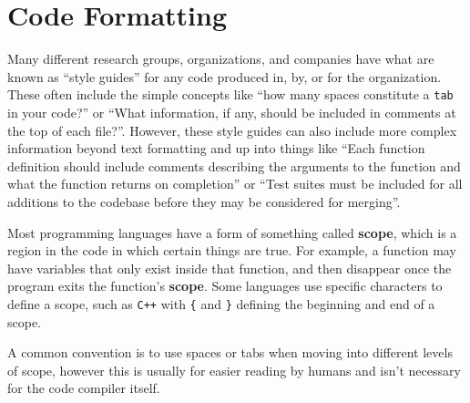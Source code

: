 \section{Code Formatting}
Many different research groups, organizations, and companies have what
are known as ``style guides'' for any code produced in, by, or for the
organization. These often include the simple concepts like ``how many
spaces constitute a \texttt{tab} in your code?'' or ``What information,
if any, should be included in comments at the top of each file?''.
However, these style guides can also include more complex information
beyond text formatting and up into things like ``Each function
definition should include comments describing the arguments to the
function and what the function returns on completion'' or ``Test suites
must be included for all additions to the codebase before they may be
considered for merging''.

Most programming languages have a form of something called
\textbf{scope}, which is a region in the code in which certain things
are true. For example, a function may have variables that only exist
inside that function, and then disappear once the program exits the
function's \textbf{scope}. Some languages use specific characters to
define a scope, such as \texttt{C++} with \texttt{\{} and \texttt{\}}
defining the beginning and end of a scope.

\begin{Shaded}
\begin{Highlighting}[]
\OperatorTok{()}
\OperatorTok{\{}
\OperatorTok{\textless{}\textless{}} \OperatorTok{;}
     \OperatorTok{(} \OperatorTok{\textless{}} \OperatorTok{)}
    \OperatorTok{\{}
\OperatorTok{\textless{}\textless{}} \OperatorTok{;}
    \OperatorTok{\}}
    \OperatorTok{;}
\OperatorTok{\}}
\end{Highlighting}
\end{Shaded}

A common convention is to use spaces or tabs when moving into different
levels of scope, however this is usually for easier reading by humans
and isn't necessary for the code compiler itself.

